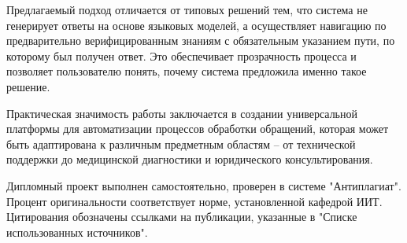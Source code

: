 Предлагаемый подход отличается от типовых решений тем, что система не генерирует ответы на основе языковых моделей, а осуществляет навигацию по предварительно верифицированным знаниям с обязательным указанием пути, по которому был получен ответ. Это обеспечивает прозрачность процесса и позволяет пользователю понять, почему система предложила именно такое решение.

Практическая значимость работы заключается в создании универсальной платформы для автоматизации процессов обработки обращений, которая может быть адаптирована к различным предметным областям – от технической поддержки до медицинской диагностики и юридического консультирования.

Дипломный проект выполнен самостоятельно, проверен в системе "Антиплагиат". Процент оригинальности соответствует норме, установленной кафедрой ИИТ. Цитирования обозначены ссылками на публикации, указанные в "Списке использованных источников".